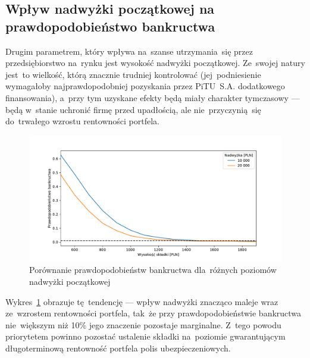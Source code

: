 \documentclass[12pt, a4paper, oneside]{mwart} %
\begin{document}
\subsection{Wpływ nadwyżki początkowej na prawdopodobieństwo bankructwa}
Drugim parametrem, który wpływa na~szanse utrzymania~się przez przedsiębiorstwo na~rynku jest wysokość nadwyżki początkowej. Ze~swojej natury jest~to wielkość, którą znacznie trudniej kontrolować (jej~podniesienie wymagałoby najprawdopodobniej pozyskania przez PiTU~S.A. dodatkowego finansowania), a~przy tym uzyskane efekty będą miały charakter tymczasowy --- będą w~stanie uchronić firmę przed upadłością, ale nie~przyczynią~się do~trwałego wzrostu rentowności portfela.
\begin{figure}
\centering
\includegraphics[width = \textwidth]{n=1000/p_bankructwa_porownanie.pdf}
\caption{Porównanie prawdopodobieństw bankructwa dla~różnych poziomów nadwyżki początkowej}
\label{p_bankructwa_porownanie_n1000}
\end{figure}
Wykres~\ref{p_bankructwa_porownanie_n1000} obrazuje tę~tendencję --- wpływ nadwyżki znacząco maleje wraz ze~wzrostem rentowności portfela, tak~że przy prawdopodobieństwie bankructwa nie~większym niż 10\% jego znaczenie pozostaje marginalne. Z~tego powodu priorytetem powinno pozostać ustalenie składki na~poziomie gwarantującym długoterminową rentowność portfela polis ubezpieczeniowych.
\end{document}
